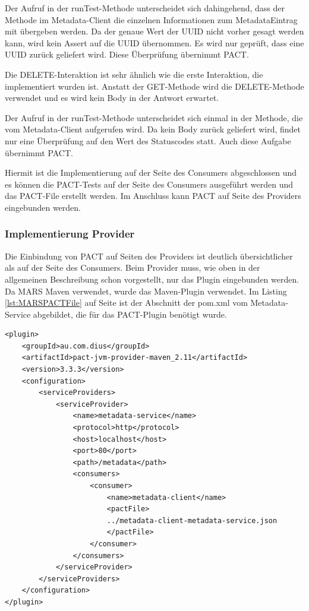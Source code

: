 \documentclass{llncs}
\begin{document}
Der Aufruf in der runTest-Methode unterscheidet sich dahingehend, dass der Methode im Metadata-Client die einzelnen Informationen zum MetadataEintrag mit übergeben werden. Da der genaue Wert der UUID nicht vorher gesagt werden kann, wird kein Assert auf die UUID übernommen. Es wird nur geprüft, dass eine UUID zurück geliefert wird. Diese Überprüfung übernimmt PACT.

Die DELETE-Interaktion ist sehr ähnlich wie die erste Interaktion, die implementiert wurden ist. Anstatt der GET-Methode wird die DELETE-Methode verwendet und es wird kein Body in der Antwort erwartet.

Der Aufruf in der runTest-Methode unterscheidet sich einmal in der Methode, die vom Metadata-Client aufgerufen wird. Da kein Body zurück geliefert wird, findet nur eine Überprüfung auf den Wert des Statuscodes statt. Auch diese Aufgabe übernimmt PACT.

Hiermit ist die Implementierung auf der Seite des Consumers abgeschlossen und es können die PACT-Tests auf der Seite des Consumers ausgeführt werden und das PACT-File erstellt werden. Im Anschluss kann PACT auf Seite des Providers eingebunden werden.
\subsubsection{Implementierung Provider}
Die Einbindung von PACT auf Seiten des Providers ist deutlich übersichtlicher als auf der Seite des Consumers. Beim Provider muss, wie oben in der allgemeinen Beschreibung schon vorgestellt, nur das Plugin eingebunden werden. Da MARS Maven verwendet, wurde das Maven-Plugin verwendet. Im Listing \ref{lst:MARSPACTFile} auf Seite \pageref{lst:MARSPACTFile} ist der Abschnitt der pom.xml vom Metadata-Service abgebildet, die für das PACT-Plugin benötigt wurde. 

\lstset{language = Java}
\begin{lstlisting}[caption=Eintrag in der pom.xml,label={lst:MARSPACTFile}]
<plugin>
    <groupId>au.com.dius</groupId>
    <artifactId>pact-jvm-provider-maven_2.11</artifactId>
    <version>3.3.3</version>
    <configuration>
        <serviceProviders>
            <serviceProvider>
                <name>metadata-service</name>
                <protocol>http</protocol>
                <host>localhost</host>
                <port>80</port>
                <path>/metadata</path>
                <consumers>
                    <consumer>
                        <name>metadata-client</name>
                        <pactFile>
                        ../metadata-client-metadata-service.json
                        </pactFile>
                    </consumer>
                </consumers>
            </serviceProvider>
        </serviceProviders>
    </configuration>
</plugin>
\end{lstlisting}
\end{document}
